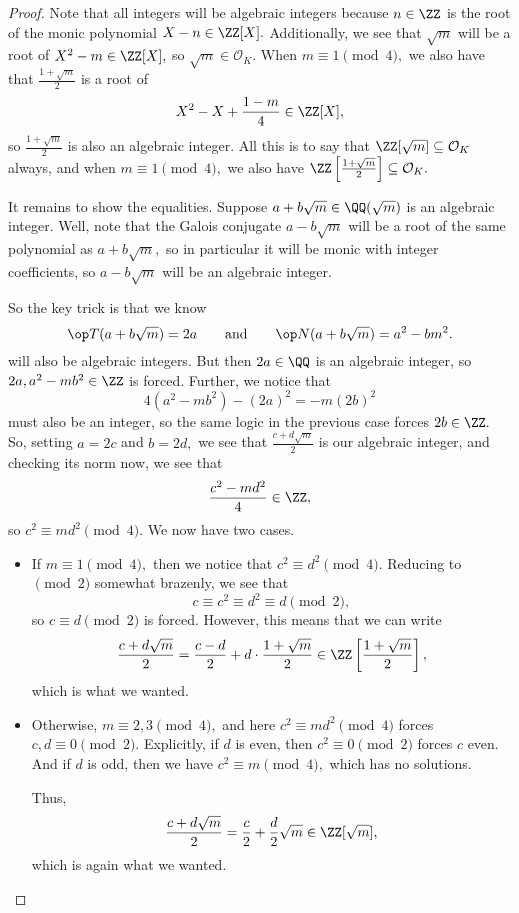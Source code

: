 \begin{proof}
	Note that all integers will be algebraic integers because $n\in\ZZ$ is the root of the monic polynomial $X-n\in\ZZ[X].$ Additionally, we see that $\sqrt m$ will be a root of $X^2-m\in\ZZ[X],$ so $\sqrt m\in\mathcal O_K.$ When $m\equiv1\pmod4,$ we also have that $\frac{1+\sqrt m}2$ is a root of
	\[X^2-X+\frac{1-m}4\in\ZZ[X],\]
	so $\frac{1+\sqrt m}2$ is also an algebraic integer. All this is to say that $\ZZ[\sqrt m]\subseteq\mathcal O_K$ always, and when $m\equiv1\pmod4,$ we also have $\ZZ\left[\frac{1+\sqrt m}2\right]\subseteq\mathcal O_K.$

	It remains to show the equalities. Suppose $a+b\sqrt m\in\QQ(\sqrt m)$ is an algebraic integer. Well, note that the Galois conjugate $a-b\sqrt m$ will be a root of the same polynomial as $a+b\sqrt m,$ so in particular it will be monic with integer coefficients, so $a-b\sqrt m$ will be an algebraic integer.

	So the key trick is that we know
	\[\op T(a+b\sqrt m)=2a\qquad\text{and}\qquad\op N(a+b\sqrt m)=a^2-bm^2.\]
	will also be algebraic integers. But then $2a\in\QQ$ is an algebraic integer, so $2a,a^2-mb^2\in\ZZ$ is forced. Further, we notice that
	\[4\left(a^2-mb^2\right)-(2a)^2=-m(2b)^2\]
	must also be an integer, so the same logic in the previous case forces $2b\in\ZZ.$ So, setting $a=2c$ and $b=2d,$ we see that $\frac{c+d\sqrt m}2$ is our algebraic integer, and checking its norm now, we see that
	\[\frac{c^2-md^2}4\in\ZZ,\]
	so $c^2\equiv md^2\pmod4.$ We now have two cases.
	\begin{itemize}
		\item If $m\equiv1\pmod4,$ then we notice that $c^2\equiv d^2\pmod4.$ Reducing to$\pmod2$ somewhat brazenly, we see that
		\[c\equiv c^2\equiv d^2\equiv d\pmod2,\]
		so $c\equiv d\pmod2$ is forced. However, this means that we can write
		\[\frac{c+d\sqrt m}2=\frac{c-d}2+d\cdot\frac{1+\sqrt m}2\in\ZZ\left[\frac{1+\sqrt m}2\right],\]
		which is what we wanted.

		\item Otherwise, $m\equiv2,3\pmod4,$ and here $c^2\equiv md^2\pmod4$ forces $c,d\equiv0\pmod2.$ Explicitly, if $d$ is even, then $c^2\equiv0\pmod2$ forces $c$ even. And if $d$ is odd, then we have $c^2\equiv m\pmod4,$ which has no solutions.
		
		Thus,
		\[\frac{c+d\sqrt m}2=\frac c2+\frac d2\sqrt m\in\ZZ[\sqrt m],\]
		which is again what we wanted.
		\qedhere
	\end{itemize}
\end{proof}
